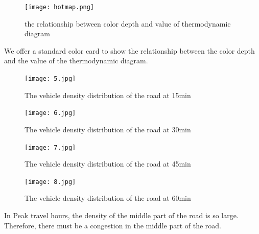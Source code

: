 \documentclass{mcmthesis}
\begin{document}
\begin{figure}[H]
	\centerline{\texttt{[image: hotmap.png]}}
	\caption{the relationship between color depth and value of thermodynamic diagram}	
\end{figure}
\indent We offer a standard color card to show the relationship between the color depth and the value of the thermodynamic diagram.
\begin{figure}[H]
	\centerline{\texttt{[image: 5.jpg]}}
	\caption{The vehicle density distribution of the road at 15min}	
\end{figure}
\begin{figure}[H]
	\centerline{\texttt{[image: 6.jpg]}}
	\caption{The vehicle density distribution of the road at 30min}	
\end{figure}
\begin{figure}[H]
	\centerline{\texttt{[image: 7.jpg]}}
	\caption{The vehicle density distribution of the road at 45min}	
\end{figure}
\begin{figure}[H]
	\centerline{\texttt{[image: 8.jpg]}}
	\caption{The vehicle density distribution of the road at 60min}	
\end{figure}
\indent\indent In Peak travel hours, the density of the middle part of the road is so large. Therefore, there must be a congestion in the middle part of the road.
\end{document}
